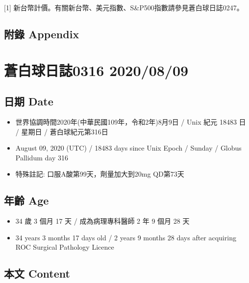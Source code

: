 \documentclass[a5paper, 11pt
]{book}
\providecommand{\tightlist}{%
  \setlength{\itemsep}{0pt}\setlength{\parskip}{0pt}}
\begin{document}
{[}1{]}
新台幣計價。有關新台幣、美元指數、S\&P500指數請參見蒼白球日誌0247。

\hypertarget{ux9644ux9304-appendix-59}{%
\subsection{附錄 Appendix}\label{ux9644ux9304-appendix-59}}

\hypertarget{ux84bcux767dux7403ux65e5ux8a8c0316-20200809}{%
\section{蒼白球日誌0316
2020/08/09}\label{ux84bcux767dux7403ux65e5ux8a8c0316-20200809}}

\hypertarget{ux65e5ux671f-date-60}{%
\subsection{日期 Date}\label{ux65e5ux671f-date-60}}

\begin{itemize}
\tightlist
\item
  世界協調時間2020年(中華民國109年，令和2年)8月9日 / Unix 紀元 18483 日
  / 星期日 / 蒼白球紀元第316日
\item
  August 09, 2020 (UTC) / 18483 days since Unix Epoch / Sunday / Globus
  Pallidum day 316
\item
  特殊註記: 口服A酸第99天，劑量加大到20mg QD第73天
\end{itemize}

\hypertarget{ux5e74ux9f61-age-60}{%
\subsection{年齡 Age}\label{ux5e74ux9f61-age-60}}

\begin{itemize}
\tightlist
\item
  34 歲 3 個月 17 天 / 成為病理專科醫師 2 年 9 個月 28 天
\item
  34 years 3 months 17 days old / 2 years 9 months 28 days after
  acquiring ROC Surgical Pathology Licence
\end{itemize}

\hypertarget{ux672cux6587-content-60}{%
\subsection{本文 Content}\label{ux672cux6587-content-60}}
\end{document}

